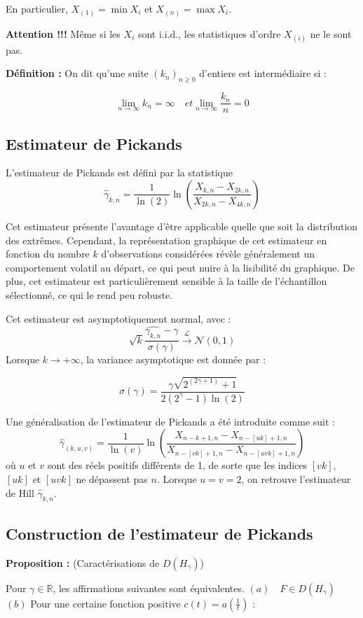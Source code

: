 \documentclass{article}
\begin{document}
En particulier, \(X_{(1)} = \min X_i\) et \(X_{(n)} = \max X_i\).

\textbf{Attention !!!} Même si les \(X_i\) sont i.i.d., les statistiques d’ordre \(X_{(i)}\) ne le sont pas.

\textbf{Définition :} On dit qu'une suite \((k_n)_{n \geq 0}\) d'entiers est intermédiaire si :

\[
\lim_{n \to \infty} k_n = \infty \quad et \lim_{n \to \infty} \frac{k_n}{n} = 0
\]
\subsection{Estimateur de Pickands}

L'estimateur de Pickands est défini par la statistique 
\[
\hat{\gamma}_{k,n} = \frac{1}{\ln(2)} \ln\left(\frac{X_{k,n} - X_{2k,n}}{X_{2k,n} - X_{4k,n}}\right)
\]

Cet estimateur présente l'avantage d'être applicable quelle que soit la distribution des extrêmes. Cependant, la représentation graphique de cet estimateur en fonction du nombre \(k\) d'observations considérées révèle généralement un comportement volatil au départ, ce qui peut nuire à la lisibilité du graphique. De plus, cet estimateur est particulièrement sensible à la taille de l'échantillon sélectionné, ce qui le rend peu robuste.

Cet estimateur est asymptotiquement normal, avec :
\[
\sqrt{k} \frac{\hat{\gamma_{k,n}} - \gamma}{\sigma(\gamma)} \xrightarrow{\mathcal{L}} \mathcal{N}(0,1)
\]
Lorsque \( k \to +\infty \), la variance asymptotique est donnée par :

\[
\sigma(\gamma)= \frac{\gamma \sqrt{2^{(2\gamma+1)}+1}}{2(2^{\gamma}-1) \ln(2)}
\]

Une généralisation de l'estimateur de Pickands a été introduite comme suit :
\[
\hat{\gamma}_{(k,u,v)} = \frac{1}{\ln(v)} \ln\left(\frac{X_{n-k+1,n} - X_{n-[uk]+1,n}}{X_{n-[vk]+1,n} - X_{n-[uvk]+1,n}}\right)
\]
où \(u\) et \(v\) sont des réels positifs différents de 1, de sorte que les indices \([vk]\), \([uk]\) et \([uvk]\) ne dépassent pas \(n\). Lorsque \(u = v = 2\), on retrouve l'estimateur de Hill \(\hat{\gamma}_{k,n}\).

\subsection{Construction de l'estimateur de Pickands}
\textbf{Proposition :} (Caractérisations de \( D(H_{\gamma}) \))

Pour \( \gamma \in \mathbb{R} \), les affirmations suivantes sont équivalentes. \newline
\( (a) \quad F \in D(H_{\gamma}) \) \newline
\( (b) \) Pour une certaine fonction positive \( c(t) = a\left( \frac{1}{t} \right) \) :
\end{document}
